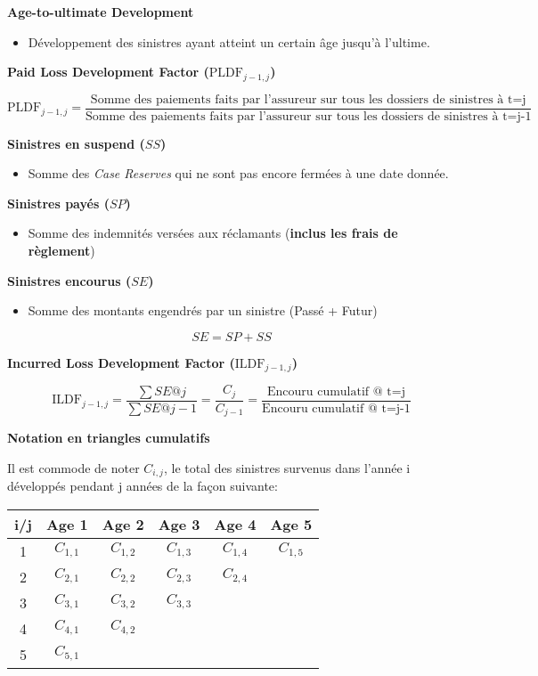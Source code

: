 \textbf{Age-to-ultimate Development}
\begin{itemize}
\item Développement des sinistres ayant atteint un certain âge jusqu'à l'ultime.
\end{itemize}

\textbf{Paid Loss Development Factor ($\text{PLDF}_{j-1,j}$)}

$$\text{PLDF}_{j-1,j} = \frac{\text{Somme des paiements faits par l'assureur sur tous les dossiers de sinistres à t=j}}{\text{Somme des paiements faits par l'assureur sur tous les dossiers de sinistres à t=j-1}}$$

\textbf{Sinistres en suspend ($SS$)}
\begin{itemize}
  \item Somme des \textit{Case Reserves} qui ne sont pas encore fermées à une date donnée.
 \end{itemize}
\textbf{Sinistres payés ($SP$)}
\begin{itemize}
  \item Somme des indemnités versées aux réclamants (\textbf{inclus les frais de règlement})
 \end{itemize} 
\textbf{Sinistres encourus ($SE$)}
\begin{itemize}
  \item Somme des montants engendrés par un sinistre (Passé + Futur)
\end{itemize}
$$SE = SP + SS$$

\textbf{Incurred Loss Development Factor ($\text{ILDF}_{j-1,j}$)}

$$\text{ILDF}_{j-1,j}=\frac{\sum SE@j}{\sum SE@j-1}=\frac{C_j}{C_{j-1}}=\frac{\text{Encouru cumulatif @ t=j}}{\text{Encouru cumulatif @ t=j-1}}$$

\textbf{Notation en triangles cumulatifs}

Il est commode de noter $C_{i,j}$, le total des sinistres survenus dans l'année i développés pendant j années de la façon suivante:

\begin{tabular}{|c|c|c|c|c|c|}
  \hline
   i/j & Age 1 & Age 2 & Age 3 & Age 4 & Age 5 \\
  \hline
1 & $C_{1,1}$ & $C_{1,2}$ & \color{red} $C_{1,3}$ & $C_{1,4}$ & $C_{1,5}$ \\
2 & $C_{2,1}$ & \color{red} $C_{2,2}$ & $C_{2,3}$ & $C_{2,4}$ & \\
3 & \color{red} $C_{3,1}$ & $C_{3,2}$ & $C_{3,3}$ &  & \\
4 & $C_{4,1}$ & $C_{4,2}$ &  &  & \\
5 & $C_{5,1}$ &  &  &  & \\
  \hline
\end{tabular}\\


